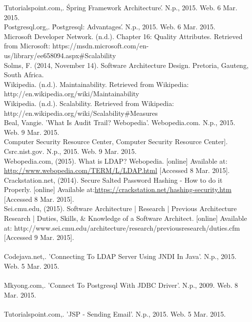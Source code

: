 Tutorialspoint.com,. \'Spring Framework Architecture\'. N.p., 2015. Web. 6 Mar. 2015. \\

Postgresql.org,. \'Postgresql: Advantages\'. N.p., 2015. Web. 6 Mar. 2015.\\

Microsoft Developer Network. (n.d.). Chapter 16: Quality Attributes. Retrieved from Microsoft: https://msdn.microsoft.com/en-us/library/ee658094.aspx#Scalability\\

Solms, F. (2014, November 14). Software Architecture Design. Pretoria, Gauteng, South Africa.\\

Wikipedia. (n.d.). Maintainability. Retrieved from Wikipedia: http://en.wikipedia.org/wiki/Maintainability\\

Wikipedia. (n.d.). Scalability. Retrieved from Wikipedia: http://en.wikipedia.org/wiki/Scalability#Measures\\

Beal, Vangie. 'What Is Audit Trail? Webopedia'. Webopedia.com. N.p., 2015. Web. 9 Mar. 2015.\\

Computer Security Resource Center, Computer Security Resource Center]. Csrc.nist.gov. N.p., 2015. Web. 9 Mar. 2015.\\

Webopedia.com, (2015). What is LDAP? Webopedia. [online] Available at: \url{http://www.webopedia.com/TERM/L/LDAP.html} [Accessed 8 Mar. 2015].\\

Crackstation.net, (2014). Secure Salted Password Hashing - How to do it Properly. [online] Available at:\url{https://crackstation.net/hashing-security.htm} [Accessed 8 Mar. 2015].\\

Sei.cmu.edu, (2015). Software Architecture | Research | Previous Architecture Research | Duties, Skills, & Knowledge of a Software Architect. [online] Available at: http://www.sei.cmu.edu/architecture/research/previousresearch/duties.cfm [Accessed 9 Mar. 2015]. \\
\\
Codejava.net,. 'Connecting To LDAP Server Using JNDI In Java'. N.p., 2015. Web. 5 Mar. 2015.\\
\\
Mkyong.com,. 'Connect To Postgresql With JDBC Driver'. N.p., 2009. Web. 8 Mar. 2015.\\
\\
Tutorialspoint.com,. 'JSP - Sending Email'. N.p., 2015. Web. 5 Mar. 2015.\\


